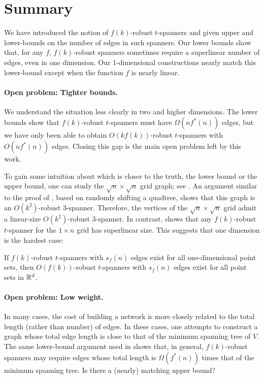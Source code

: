 \documentclass[final]{siamltex}
\begin{document}
\section{Summary}

We have introduced the notion of $f(k)$-robust $t$-spanners and given
upper and lower-bounds on the number of edges in such spanners.  Our lower
bounds show that, for any $f$, $f(k)$-robust spanners sometimes require
a superlinear number of edges, even in one dimension.  Our 1-dimensional
constructions nearly match this lower-bound except when the function
$f$ is nearly linear.

\paragraph{Open problem: Tighter bounds.}
We understand the situation less clearly in two and higher dimensions.
The lower bounds show that $f(k)$-robust $t$-spanners must have
$\Omega(nf^*(n))$ edges, but we have only been able to obtain
$O(kf(k))$-robust $t$-spanners with $O(nf^*(n))$ edges.  Closing this
gap is the main open problem left by this work.

To gain some intuition about which is closer to the truth, the lower
bound or the upper bound, one can study the $\sqrt{n}\times\sqrt{n}$
grid graph; see .  An argument similar to the proof of
, based on randomly shifting a quadtree, shows that
this graph is an $O(k^2)$-robust $3$-spanner.  Therefore, the vertices
of the $\sqrt{n}\times\sqrt{n}$ grid admit a linear-size $O(k^2)$-robust
3-spanner.  In contrast,  shows that any
$f(k)$-robust $t$-spanner for the $1\times n$ grid has superlinear size.
This suggests that one dimension is the hardest case:

\begin{conj}
If $f(k)$-robust $t$-spanners with $s_f(n)$ edges exist for all one-dimensional point sets, then $O(f(k))$-robust $t$-spanners with $s_f(n)$ edges exist for all point sets in $\mathbb{R}^d$.
\end{conj}


\paragraph{Open problem: Low weight.}

In many cases, the cost of building a network is more closely related to
the total length (rather than number) of edges.  In these cases, one
attempts to construct a graph whose total edge length is close to that
of the minimum spanning tree of $V$. The same lower-bound argument used
in  shows that, in general, $f(k)$-robust
spanners may require edges whose total length is $\Omega(f^*(n))$ times
that of the minimum spanning tree.  Is there a (nearly) matching upper bound?
\end{document}
